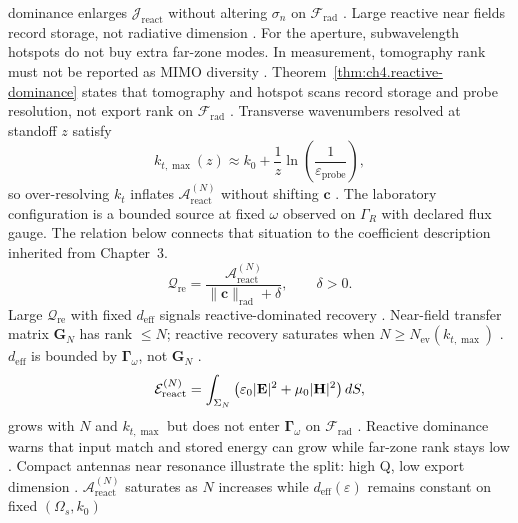 dominance enlarges \(\mathcal{J}_{\mathrm{react}}\) without altering \(\sigma_{n}\) on \(\mathcal{F}_{\mathrm{rad}}\) \cite{devaney2004}.
Large reactive near fields record storage, not radiative dimension \cite{stratton1941}. For the aperture, subwavelength hotspots do not buy extra far-zone modes. In measurement, tomography rank must not be reported as MIMO diversity \cite{devaney2004}.
Theorem~\ref{thm:ch4.reactive-dominance} states that tomography and hotspot scans record storage and probe resolution, not export
rank on \(\mathcal{F}_{\mathrm{rad}}\) \cite{stratton1941}. 
Transverse wavenumbers resolved at standoff \(z\) satisfy
\begin{equation}
\label{eq:ch4.ev-wavenumber-budget}
k_{t,\max}(z)\approx k_{0}+\frac{1}{z}\ln\!\left(\frac{1}{\varepsilon_{\mathrm{probe}}}\right),
\end{equation}
so over-resolving \(k_{t}\) inflates \(\mathcal{A}_{\mathrm{react}}^{(N)}\) without shifting \(\mathbf{c}\) \cite{jackson1999}.
The laboratory configuration is a bounded source at fixed $\omega$ observed on $\Gamma_R$ with declared flux gauge. The relation below connects that situation to the coefficient description inherited from Chapter~3. \cite{stratton1941}
\begin{equation}
\label{eq:ch4.react-export-ratio}
\mathcal{Q}_{\mathrm{re}}=\frac{\mathcal{A}_{\mathrm{react}}^{(N)}}{\|\mathbf{c}\|_{\mathrm{rad}}+\delta},\qquad \delta>0.
\end{equation}
Large \(\mathcal{Q}_{\mathrm{re}}\) with fixed \(d_{\mathrm{eff}}\) signals reactive-dominated recovery \cite{harrington2001}.
Near-field transfer matrix \(\mathbf{G}_{N}\) has rank \(\le N\); reactive recovery saturates when \(N\ge N_{\mathrm{ev}}(k_{t,\max})\)
\cite{harrington2001}. \(d_{\mathrm{eff}}\) is bounded by \(\boldsymbol{\Gamma}_\omega\), not \(\mathbf{G}_{N}\) \cite{stratton1941}.
\begin{equation}
\label{eq:ch4.reactive-energy-budget}
\mathcal{E}_{\mathrm{react}}^{(N)}=\int_{\Sigma_{N}}\big(\varepsilon_{0}|\mathbf{E}|^{2}+\mu_{0}|\mathbf{H}|^{2}\big)\,dS,
\end{equation}
grows with \(N\) and \(k_{t,\max}\) but does not enter \(\boldsymbol{\Gamma}_\omega\) on \(\mathcal{F}_{\mathrm{rad}}\) \cite{jackson1999}.
Reactive dominance warns that input match and stored energy can grow while far-zone rank stays low \cite{stratton1941}. Compact antennas near resonance illustrate the split: high Q, low export dimension \cite{jackson1999}.
\label{lem:ch4.probe-sat-lemma}
\(\mathcal{A}_{\mathrm{react}}^{(N)}\) saturates as \(N\) increases while \(d_{\mathrm{eff}}(\varepsilon)\) remains constant on fixed \((\Omega_{s},k_{0})\)
